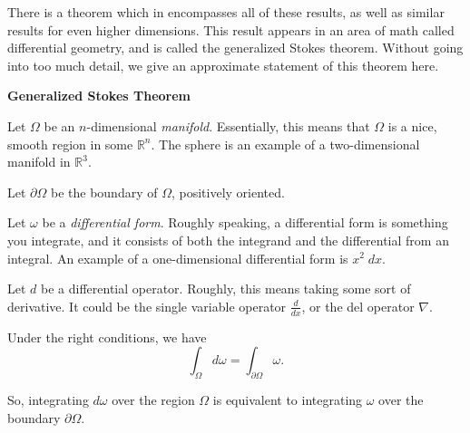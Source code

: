 \documentclass{ximera}
\begin{document}
There is a theorem which in encompasses all of these results, as well as similar results for even higher dimensions. This result appears in an area of math called differential geometry, and is called the generalized Stokes theorem. Without going into too much detail, we give an approximate statement of this theorem here.

\begin{theorem}
\textbf{Generalized Stokes Theorem}

Let $\Omega$ be an $n$-dimensional \emph{manifold}. Essentially, this means that $\Omega$ is a nice, smooth region in some $\mathbb{R}^n$. The sphere is an example of a two-dimensional manifold in $\mathbb{R}^3$.

Let $\partial\Omega$ be the boundary of $\Omega$, positively oriented.

Let $\omega$ be a \emph{differential form}. Roughly speaking, a differential form is something you integrate, and it consists of both the integrand and the differential from an integral. An example of a one-dimensional differential form is $x^2\;dx$.

Let $d$ be a differential operator. Roughly, this means taking some sort of derivative. It could be the single variable operator $\frac{d}{dx}$, or the del operator $\nabla$.

Under the right conditions, we have
\[
\int_{\Omega} d\omega = \int_{\partial \Omega}\omega.
\]

So, integrating $d\omega$ over the region $\Omega$ is equivalent to integrating $\omega$ over the boundary $\partial \Omega$.
\end{theorem}
\end{document}
